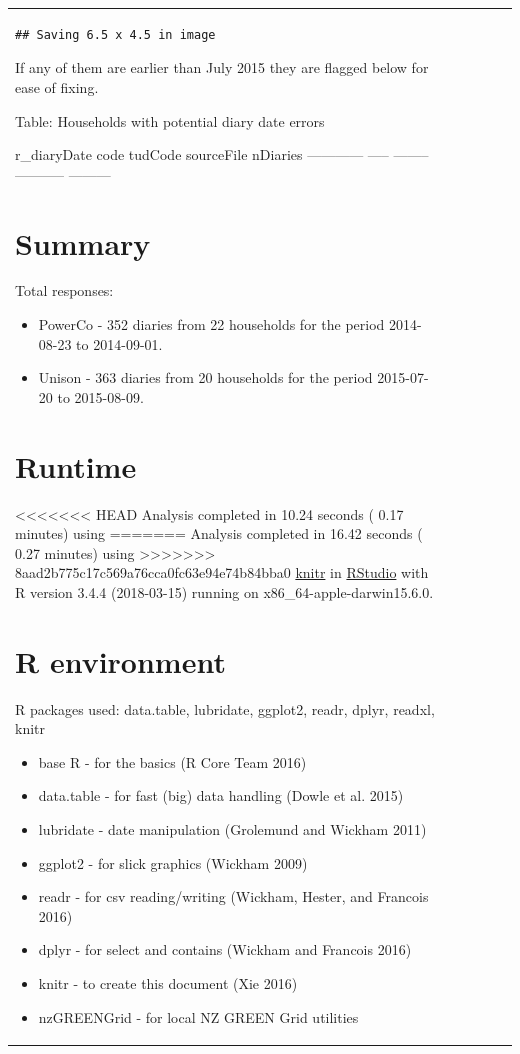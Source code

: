 \documentclass[]{article}
\providecommand{\tightlist}{%
  \setlength{\itemsep}{0pt}\setlength{\parskip}{0pt}}
\begin{document}
\begin{longtable}[]{@{}llllll@{}}
\begin{verbatim}
## Saving 6.5 x 4.5 in image
\end{verbatim}

If any of them are earlier than July 2015 they are flagged below for
ease of fixing.

Table: Households with potential diary date errors

r\_diaryDate code tudCode sourceFile nDiaries ------------ -----
-------- ----------- ---------

\section{Summary}\label{summary}

Total responses:

\begin{itemize}
\tightlist
\item
  PowerCo - 352 diaries from 22 households for the period 2014-08-23 to
  2014-09-01.
\item
  Unison - 363 diaries from 20 households for the period 2015-07-20 to
  2015-08-09.
\end{itemize}

\section{Runtime}\label{runtime}

<<<<<<< HEAD
Analysis completed in 10.24 seconds ( 0.17 minutes) using
=======
Analysis completed in 16.42 seconds ( 0.27 minutes) using
>>>>>>> 8aad2b775c17c569a76cca0fc63e94e74b84bba0
\href{https://cran.r-project.org/package=knitr}{knitr} in
\href{http://www.rstudio.com}{RStudio} with R version 3.4.4 (2018-03-15)
running on x86\_64-apple-darwin15.6.0.

\section{R environment}\label{r-environment}

R packages used: data.table, lubridate, ggplot2, readr, dplyr, readxl,
knitr

\begin{itemize}
\tightlist
\item
  base R - for the basics (R Core Team 2016)
\item
  data.table - for fast (big) data handling (Dowle et al. 2015)
\item
  lubridate - date manipulation (Grolemund and Wickham 2011)
\item
  ggplot2 - for slick graphics (Wickham 2009)
\item
  readr - for csv reading/writing (Wickham, Hester, and Francois 2016)
\item
  dplyr - for select and contains (Wickham and Francois 2016)
\item
  knitr - to create this document (Xie 2016)
\item
  nzGREENGrid - for local NZ GREEN Grid utilities
\end{itemize}


\end{longtable}
\end{document}
